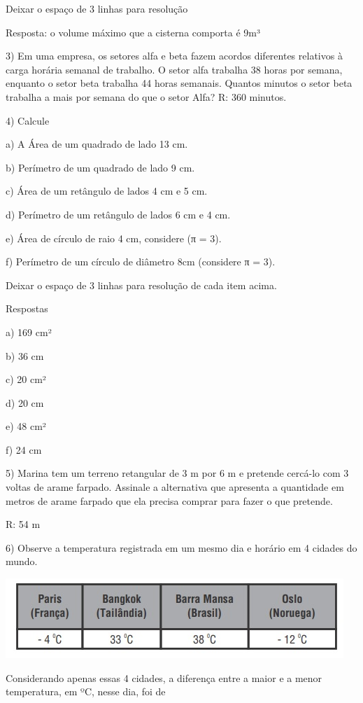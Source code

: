 Deixar o espaço de 3 linhas para resolução

Resposta: o volume máximo que a cisterna comporta é 9m³

3) Em uma empresa, os setores alfa e beta fazem acordos diferentes
relativos à carga horária semanal de trabalho. O setor alfa trabalha 38
horas por semana, enquanto o setor beta trabalha 44 horas semanais.
Quantos minutos o setor beta trabalha a mais por semana do que o setor
Alfa? R: 360 minutos.

4) Calcule

a) A Área de um quadrado de lado 13 cm.

b) Perímetro de um quadrado de lado 9 cm.

c) Área de um retângulo de lados 4 cm e 5 cm.

d) Perímetro de um retângulo de lados 6 cm e 4 cm.

e) Área de círculo de raio 4 cm, considere (π = 3).

f) Perímetro de um círculo de diâmetro 8cm (considere π = 3).

Deixar o espaço de 3 linhas para resolução de cada item acima.

Respostas

a) 169 cm²

b) 36 cm

c) 20 cm²

d) 20 cm

e) 48 cm²

f) 24 cm

5) Marina tem um terreno retangular de 3 m por 6 m e pretende cercá-lo
com 3 voltas de arame farpado. Assinale a alternativa que apresenta a
quantidade em metros de arame farpado que ela precisa comprar para fazer
o que pretende.

R: 54 m

6) Observe a temperatura registrada em um mesmo dia e horário em 4
cidades do mundo.

\includegraphics[width=5.03125in,height=1.1875in]{./imgSAEB_6_MAT/media/image96.png}

Considerando apenas essas 4 cidades, a diferença entre a maior e a menor
temperatura, em ºC, nesse dia, foi de

